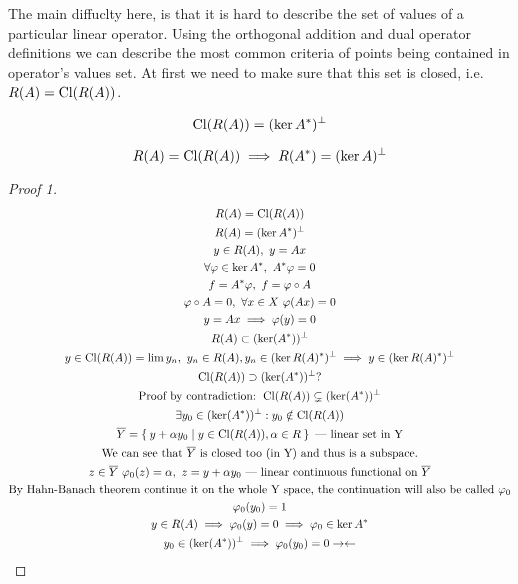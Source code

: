 The main diffuclty here, is that it is hard to describe the set of values of a
particular linear operator.
Using the orthogonal addition and dual operator definitions we can describe the
most common criteria of points being contained in operator's values set. At first we need to
make sure that this set is closed, i.e. $R(A) = \operatorname{Cl}({R(A)})$.

\begin{thm}[1]
  \[
    \operatorname{Cl}({R(A)}) = (\ker{A^*})^\perp
  \]
\end{thm}

\begin{thm}[2]
  \[
    R(A) = \operatorname{Cl}({R(A)}) \implies R(A^*) = (\ker{A})^\perp
  \]
\end{thm}

\begin{proof}[Proof 1]
  \begin{gather*}
    R(A) = \operatorname{Cl}({R(A)}) \\
    R(A) = (\ker{A^*})^\perp \\
    y \in R(A),\ y = Ax \\
    \forall \varphi \in \ker{A^*},\ A^* \varphi = 0 \\
    f = A^* \varphi,\ f = \varphi \circ A \\
    \varphi \circ A = 0,\ \forall x \in X\ \varphi(A x) = 0 \\ 
    y = Ax \implies \varphi(y) = 0 \\
    R(A) \subset (\ker(A^*))^\perp \\
    y \in \operatorname{Cl}({R(A)}) = \lim y_n,\ y_n \in R(A), y_n \in (\ker{R(A)^*})^\perp
    \implies y \in (\ker{R(A)^*})^\perp \\
    \operatorname{Cl}({R(A)}) \supset (\ker(A^*))^\perp ?\\
    \text{Proof by contradiction: } \operatorname{Cl}({R(A)}) \subsetneq (\ker(A^*))^\perp \\
    \exists y_0 \in (\ker(A^*))^\perp : y_0 \notin \operatorname{Cl}({R(A)}) \\
    \overline{Y} = \Set{ y + \alpha y_0 | y \in \operatorname{Cl}({R(A)}), \alpha \in R } \text{ ---
      linear set in Y} \\
    \text{We can see that $\overline{Y}$ is closed too
      (in Y) and thus is a subspace.} \\
    z \in \overline{Y}\ \varphi_0(z) = \alpha,\ z = y + \alpha y_0 \text{ --- 
      linear continuous functional on $\overline{Y}$} \\
    \text{By Hahn-Banach theorem continue it on the whole Y space, the continuation will
      also be called $\varphi_0$} \\
    \varphi_0(y_0) = 1 \\
    y \in R(A) \implies \varphi_0(y) = 0 \implies \varphi_0 \in \ker{A^*} \\
    y_0 \in (\ker(A^*))^\perp \implies \varphi_0(y_0) = 0 \rightarrow\leftarrow 
  \end{gather*} \qedhere
\end{proof}

